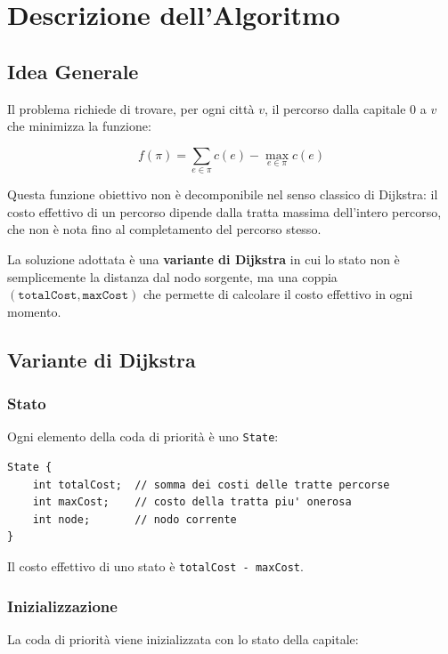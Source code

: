 \chapter{Descrizione dell'Algoritmo}

\section{Idea Generale}

Il problema richiede di trovare, per ogni città $v$, il percorso dalla 
capitale $0$ a $v$ che minimizza la funzione:

\begin{equation}
    f(\pi) = \sum_{e \in \pi} c(e) - \max_{e \in \pi} c(e)
\end{equation}

Questa funzione obiettivo non è decomponibile nel senso classico di 
Dijkstra: il costo effettivo di un percorso dipende dalla tratta massima 
dell'intero percorso, che non è nota fino al completamento del percorso stesso.

La soluzione adottata è una \textbf{variante di Dijkstra} in cui lo stato 
non è semplicemente la distanza dal nodo sorgente, ma una coppia 
$(\texttt{totalCost}, \texttt{maxCost})$ che permette di calcolare il 
costo effettivo in ogni momento.

\section{Variante di Dijkstra}

\subsection{Stato}

Ogni elemento della coda di priorità è uno \texttt{State}:

\begin{lstlisting}
State {
    int totalCost;  // somma dei costi delle tratte percorse
    int maxCost;    // costo della tratta piu' onerosa
    int node;       // nodo corrente
}
\end{lstlisting}

Il costo effettivo di uno stato è \texttt{totalCost - maxCost}.

\subsection{Inizializzazione}

La coda di priorità viene inizializzata con lo stato della capitale:

